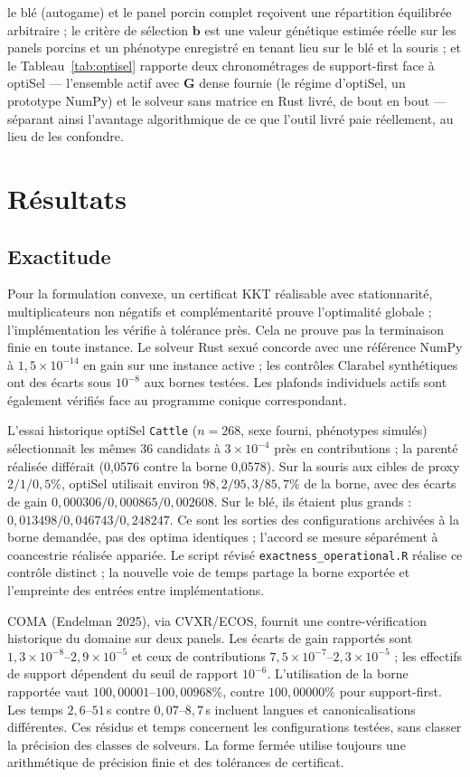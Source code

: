 \documentclass[11pt]{article}
\newcommand{\bb}{\mathbf{b}}
\newcommand{\bG}{\mathbf{G}}
\begin{document}
le blé (autogame) et le panel porcin complet reçoivent une répartition équilibrée arbitraire ; le critère de sélection $\bb$ est une valeur génétique estimée réelle sur les panels porcins et un phénotype enregistré en tenant lieu sur le blé et la souris ; et le Tableau~\ref{tab:optisel} rapporte deux chronométrages de support-first face à optiSel --- l'ensemble actif avec $\bG$ dense fournie (le régime d'optiSel, un prototype NumPy) et le solveur sans matrice en Rust livré, de bout en bout --- séparant ainsi l'avantage algorithmique de ce que l'outil livré paie réellement, au lieu de les confondre.

\section{Résultats}

\subsection{Exactitude}\label{sec:exactness}

Pour la formulation convexe, un certificat KKT réalisable avec stationnarité, multiplicateurs non négatifs et complémentarité prouve l'optimalité globale ; l'implémentation les vérifie à tolérance près. Cela ne prouve pas la terminaison finie en toute instance. Le solveur Rust sexué concorde avec une référence NumPy à $1{,}5\times10^{-14}$ en gain sur une instance active ; les contrôles Clarabel synthétiques ont des écarts sous $10^{-8}$ aux bornes testées. Les plafonds individuels actifs sont également vérifiés face au programme conique correspondant.

L'essai historique optiSel \texttt{Cattle} ($n=268$, sexe fourni, phénotypes simulés) sélectionnait les mêmes 36 candidats à $3\times10^{-4}$ près en contributions ; la parenté réalisée différait (0,0576 contre la borne 0,0578). Sur la souris aux cibles de proxy $2/1/0{,}5\%$, optiSel utilisait environ $98{,}2/95{,}3/85{,}7\%$ de la borne, avec des écarts de gain $0{,}000306/0{,}000865/0{,}002608$. Sur le blé, ils étaient plus grands : $0{,}013498/0{,}046743/0{,}248247$. Ce sont les sorties des configurations archivées à la borne demandée, pas des optima identiques ; l'accord se mesure séparément à coancestrie réalisée appariée. Le script révisé \texttt{exactness\_operational.R} réalise ce contrôle distinct ; la nouvelle voie de temps partage la borne exportée et l'empreinte des entrées entre implémentations.

COMA (Endelman 2025), via CVXR/ECOS, fournit une contre-vérification historique du domaine sur deux panels. Les écarts de gain rapportés sont $1{,}3\times10^{-8}$--$2{,}9\times10^{-5}$ et ceux de contributions $7{,}5\times10^{-7}$--$2{,}3\times10^{-5}$ ; les effectifs de support dépendent du seuil de rapport $10^{-6}$. L'utilisation de la borne rapportée vaut $100{,}00001$--$100{,}00968\%$, contre $100{,}00000\%$ pour support-first. Les temps $2{,}6$--$51$\,s contre $0{,}07$--$8{,}7$\,s incluent langues et canonicalisations différentes. Ces résidus et temps concernent les configurations testées, sans classer la précision des classes de solveurs. La forme fermée utilise toujours une arithmétique de précision finie et des tolérances de certificat.
\end{document}
